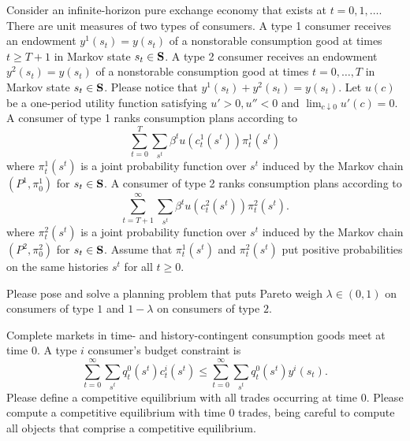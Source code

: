 \noindent Consider an infinite-horizon pure exchange economy that exists at $t=0, 1, \ldots $.
There are unit measures of  two types of consumers.
A type 1 consumer receives an endowment $y^1(s_t) = y(s_t)$ of a nonstorable consumption good at times $t\geq T+1$
in Markov state $s_t \in {\bf S}$.  A type 2 consumer receives an endowment $y^2(s_t) = y(s_t)$ of a nonstorable consumption good at times $t =0, \ldots, T$
in Markov state $s_t \in {\bf S}$. Please notice that $y^1(s_t) + y^2(s_t) = y(s_t)$.
Let $u(c)$ be a one-period utility 
function satisfying $u' > 0, u'' < 0$ and $\lim_{c \downarrow 0} u'(c) = 0$.
 A consumer of type 1  ranks consumption plans according to 
$$ \sum_{t=0}^T \sum_{s^t} \beta^t u(c_t^1(s^t)) \pi^1_t(s^t)$$
where $\pi^1_t(s^t)$ is a joint probability function over $s^t$ induced by the Markov chain $(P^1, \pi^1_0)$ for $s_t
\in {\bf S}$.
A consumer of type 2 ranks consumption plans according to 
$$ \sum_{t=T+1}^\infty \sum_{s^t} \beta^t u(c_t^2(s^t)) \pi^2_t(s^t) .$$
where $\pi^2_t(s^t)$ is a joint probability function over $s^t$ induced by the Markov chain $(P^2, \pi^2_0)$ for $s_t
\in {\bf S}$.
Assume that $\pi^1_t(s^t)$ and $\pi^2_t(s^t)$ put positive probabilities on the same histories $s^t$ for all $t\geq 0$.

\medskip
{} Please pose and solve a planning problem that puts Pareto weigh $\lambda \in (0,1)$ on consumers
of type 
$1$ and $ 1 - \lambda$ on consumers of type $2$.
 
\medskip
{} Complete markets in time- and  history-contingent consumption goods
meet at time $0$.
A type $i$ consumer's budget constraint is
$$ \sum_{t=0}^\infty \sum_{s^t} q_t^0(s^t) c^i_t(s^t) \leq  \sum_{t=0}^\infty \sum_{s^t} q_t^0(s^t) y^i(s_t) . $$Please define a competitive equilibrium with all trades occurring at time $0$.
\medskip
{} Please compute a competitive equilibrium with time $0$ trades, being careful to compute
all objects that comprise a competitive equilibrium.



\medskip


 
\medskip

